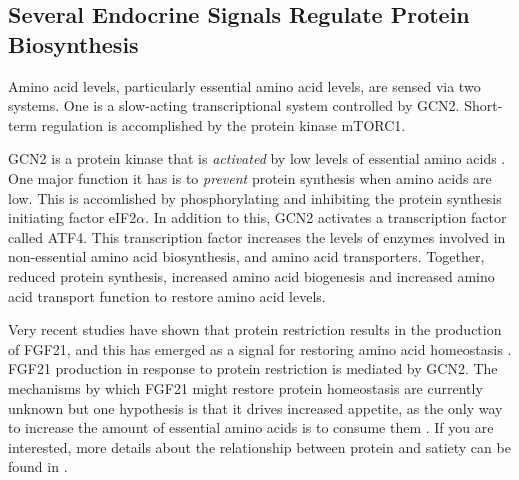 \documentclass{tufte-handout}
\begin{document}
\subsection{Several Endocrine Signals Regulate Protein Biosynthesis}

Amino acid levels, particularly essential amino acid levels, are sensed via two systems.  One is a slow-acting transcriptional system controlled by GCN2.  Short-term regulation is accomplished by the protein kinase mTORC1.

  GCN2 is a protein kinase that is \emph{activated} by low levels of essential amino acids \citep{Castilho2014}.  One major function it has is to \emph{prevent} protein synthesis when amino acids are low.  This is accomlished by phosphorylating and inhibiting the protein synthesis initiating factor eIF2$\alpha$.  In addition to this, GCN2 activates a transcription factor called ATF4.  This transcription factor increases the levels of enzymes involved in non-essential amino acid biosynthesis, and amino acid transporters.  Together, reduced protein synthesis, increased amino acid biogenesis and increased amino acid transport function to restore amino acid levels.  

  Very recent studies have shown that protein restriction results in the production of FGF21, and this has emerged as a signal for restoring amino acid homeostasis \citep{Laeger2014}.  FGF21 production in response to protein restriction is mediated by GCN2.  The mechanisms by which FGF21 might restore protein homeostasis are currently unknown but one hypothesis is that it drives increased appetite, as the only way to increase the amount of essential amino acids is to consume them \citep{Solon-Biet2016a}.  If you are interested, more details about the relationship between protein and satiety can be found in \citet{Morrison2015}.
\end{document}

